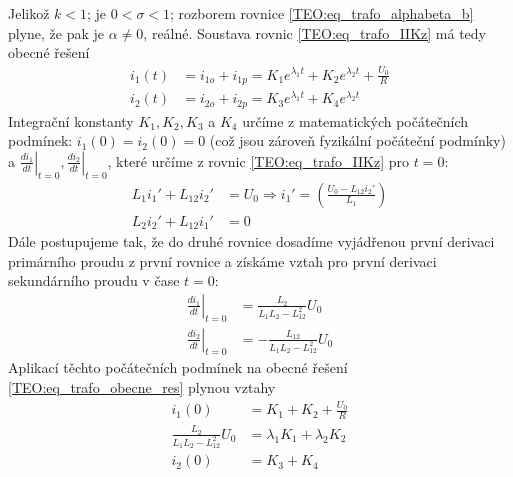 \begin{example}
  Jelikož $k<1$; je $0<\sigma<1$; rozborem rovnice \ref{TEO:eq_trafo_alphabeta_b} plyne, že pak
  je $\alpha\neq0$, reálné. Soustava rovnic \ref{TEO:eq_trafo_IIKz} má tedy obecné řešení
  \begin{subequations}\label{TEO:eq_trafo_obecne_res}
    \begin{align}
      i_1(t) &= i_{1o} +i_{1p} = K_1e^{\lambda_1t} + K_2e^{\lambda_2t} +\frac{U_0}{R} \\
      i_2(t) &= i_{2o} +i_{2p} = K_3e^{\lambda_1t} + K_4e^{\lambda_2t}
    \end{align}
  \end{subequations}
  Integrační konstanty $K_1, K_2, K_3$ a $K_4$ určíme z matematických počátečních podmínek:
  $i_1(0)=i_2(0)=0$ (což jsou zároveň fyzikální počáteční podmínky) a
  $\left.\frac{di_1}{dt}\right\rvert_{t=0}, \left.\frac{di_2}{dt}\right\rvert_{t=0}$, které určíme z rovnic
  \ref{TEO:eq_trafo_IIKz} pro $t=0$:
  \begin{subequations}\label{TEO:eq_trafo_didt_t0}
    \begin{align}
      L_1i_1'+L_{12}i_2' &= U_0 \Longrightarrow i_1' = \left(\frac{U_0-L_{12}i_2'}{L_1}\right)\\
      L_2i_2'+L_{12}i_1' &= 0
    \end{align}
  \end{subequations}
  Dále postupujeme tak, že do druhé rovnice dosadíme vyjádřenou první derivaci primárního
  proudu z první rovnice a získáme vztah pro první derivaci sekundárního proudu v čase $t=0$:
    \begin{subequations}\label{TEO:eq_trafo_dev_i1i2}
    \begin{align}
      \left.\frac{di_1}{dt}\right\rvert_{t=0} &=   \frac{L_{2}}{L_1L_2-L_{12}^2}U_0                        \\
      \left.\frac{di_2}{dt}\right\rvert_{t=0} &=  -\frac{L_{12}}{L_1L_2-L_{12}^2}U_0
    \end{align}
  \end{subequations}
  Aplikací těchto počátečních podmínek na obecné řešení \ref{TEO:eq_trafo_obecne_res} plynou
  vztahy
  \begin{subequations}
    \begin{align}
    i_1(0)                            &= K_1 + K_2 +\frac{U_0}{R}                         \\
    \frac{L_{2}}{L_1L_2-L_{12}^2}U_0  &= \lambda_1K_1 + \lambda_2K_2                      \\
    i_2(0)                            &= K_3 + K_4                                        \\

\end{align}
\end{subequations}
\end{example}
